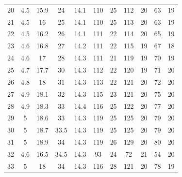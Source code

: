 \documentclass[11pt,letterpaper]{extarticle}        %
\numberwithin{equation}{section}                    %
\begin{document}
\begin{table}[H]
\begin{tabular}{|ccccccccccc|}
20 & 4.5 & 15.9 & 24 & 14.1 & 110 & 25 & 112 & 20 & 63 & 19 \\
21 & 4.5 & 16 & 25 & 14.1 & 110 & 25 & 113 & 20 & 63 & 19 \\
22 & 4.5 & 16.2 & 26 & 14.1 & 111 & 22 & 114 & 20 & 65 & 19 \\
23 & 4.6 & 16.8 & 27 & 14.2 & 111 & 22 & 115 & 19 & 67 & 18 \\
24 & 4.6 & 17 & 28 & 14.3 & 111 & 21 & 119 & 19 & 70 & 19 \\
25 & 4.7 & 17.7 & 30 & 14.3 & 112 & 22 & 120 & 19 & 71 & 20 \\
26 & 4.8 & 18 & 31 & 14.3 & 113 & 22 & 121 & 20 & 72 & 20 \\
27 & 4.9 & 18.1 & 32 & 14.3 & 115 & 23 & 121 & 20 & 75 & 20 \\
28 & 4.9 & 18.3 & 33 & 14.4 & 116 & 25 & 122 & 20 & 77 & 20 \\
29 & 5 & 18.6 & 33 & 14.3 & 119 & 25 & 125 & 20 & 79 & 20 \\
30 & 5 & 18.7 & 33.5 & 14.3 & 119 & 25 & 125 & 20 & 79 & 20 \\
31 & 5 & 18.9 & 34 & 14.3 & 119 & 26 & 129 & 20 & 80 & 20 \\
32 & 4.6 & 16.5 & 34.5 & 14.3 & 93 & 24 & 72 & 21 & 54 & 20 \\
33 & 5 & 18 & 34 & 14.3 & 116 & 28 & 121 & 20 & 78 & 19 \\
\hline
\end{tabular}
\end{table}
\end{document}

